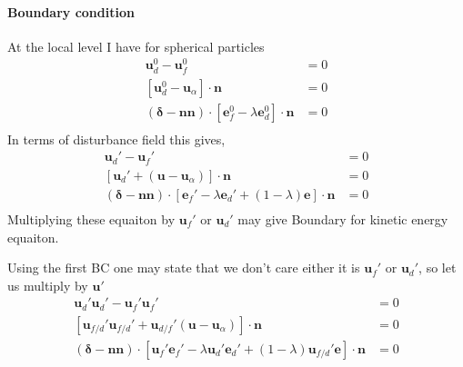 \paragraph{Boundary condition}
At the local level I have for spherical particles 
\begin{align}
    \textbf{u}_d^0 -  \textbf{u}_f^0&=0 \\
    [\textbf{u}_d^0- \textbf{u}_\alpha]\cdot \textbf{n} &= 0\\
    (\bm\delta - \textbf{nn})\cdot  [ \bm e_f^0- \lambda \bm e_d^0]\cdot \textbf{n} &= 0\\
\end{align}
In terms of disturbance field this gives, 
\begin{align}
    \textbf{u}_d' -  \textbf{u}_f'&=0 \\
    [\textbf{u}_d' + (\textbf{u} - \textbf{u}_\alpha)]\cdot \textbf{n} &= 0\\
    (\bm\delta - \textbf{nn})\cdot  [\bm e_f'- \lambda \bm e_d' + (1-\lambda) \textbf{e}]\cdot \textbf{n} &= 0\\
\end{align}
Multiplying these equaiton by $\textbf{u}_f'$ or $\textbf{u}_d'$ may give Boundary for kinetic energy equaiton.

Using the first BC one may state that we don't care either it is $\textbf{u}_f'$ or $\textbf{u}_d'$, so let us multiply by $\textbf{u}'$ 
\begin{align}
    \textbf{u}_d'\textbf{u}_d' -  \textbf{u}_f'\textbf{u}_f'&=0 \\
    [\textbf{u}_{f/d}'\textbf{u}_{f/d}' + \textbf{u}_{d/f}'(\textbf{u} - \textbf{u}_\alpha)]\cdot \textbf{n} &= 0\\
    (\bm\delta - \textbf{nn})\cdot  [\textbf{u}_f'\bm e_f'- \lambda \textbf{u}_d'\bm e_d' + (1-\lambda) \textbf{u}_{f/d}'\textbf{e}]\cdot \textbf{n} &= 0\\
\end{align}

